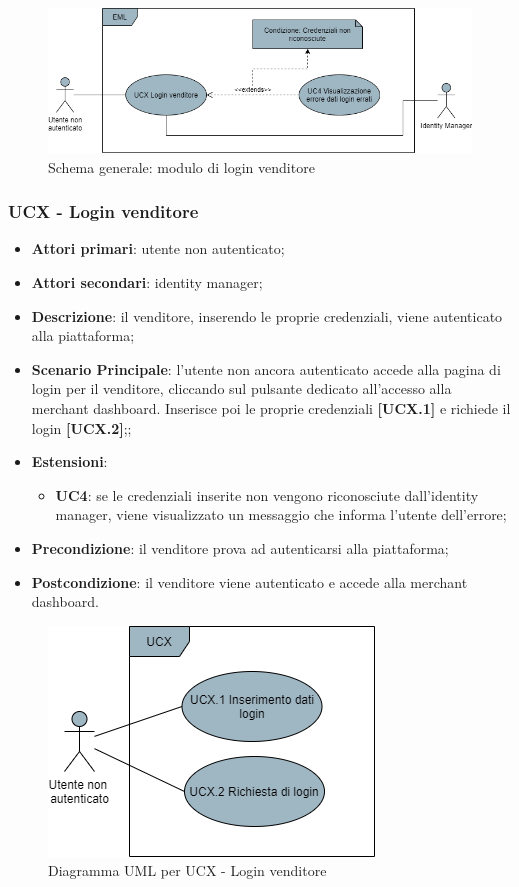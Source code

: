 \begin{figure}[H]
\centering
\includegraphics[scale=0.6]{res/UseCase/Immagini/LoginVenditore}
\caption{Schema generale: modulo di login venditore}
\end{figure}

\subsubsection{UCX - Login venditore}
\begin{itemize}
\item \textbf{Attori primari}: utente non autenticato;
\item \textbf{Attori secondari}: identity manager;
\item \textbf{Descrizione}: il venditore, inserendo le proprie credenziali, viene autenticato alla piattaforma;
\item \textbf{Scenario Principale}: l'utente non ancora autenticato accede alla pagina di login per il venditore, cliccando sul pulsante dedicato all'accesso alla merchant dashboard. Inserisce poi le proprie credenziali \textbf{[UCX.1]} e richiede il login \textbf{[UCX.2]};;
\item \textbf{Estensioni}:
\begin{itemize}
	\item \textbf{UC4}: se le credenziali inserite non vengono riconosciute dall'identity manager, viene visualizzato un messaggio che informa l'utente dell'errore;
\end{itemize}
\item \textbf{Precondizione}: il venditore prova ad autenticarsi alla piattaforma;
\item \textbf{Postcondizione}: il venditore viene autenticato e accede alla merchant dashboard.
\end{itemize}

\begin{figure}[H]
\centering
\includegraphics[scale=0.6]{res/UseCase/Immagini/LoginVenditoreSottocasi}
\caption{Diagramma UML per UCX - Login venditore}
\end{figure}

